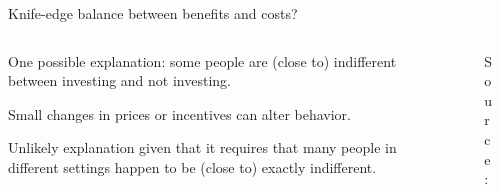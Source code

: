 \documentclass[aspectratio=169, 10pt, handout]{beamer}
\newenvironment{wideitemize}{\itemize\addtolength{\itemsep}{10pt}}{\enditemize}
\begin{document}
\begin{frame}{Knife-edge balance between benefits and costs?}

\begin{columns}[T] 

\begin{column}{.43\textwidth}
  
\begin{wideitemize}

	\item One possible explanation: some people are (close to) indifferent between investing and not investing.
	
	\item Small changes in prices or incentives can alter behavior.
	
	\item Unlikely explanation given that it requires that many people in different settings happen to be (close to) exactly indifferent.

\end{wideitemize}

\end{column}

\begin{column}{.53\textwidth}

\bigskip

\begin{figure}
    \centering
    \caption{Source: \cite{kremer2011improving,baird2016worms}}
    \label{fig:my_label}
\end{figure}

\end{column}

\end{columns}

\end{frame}
\end{document}
